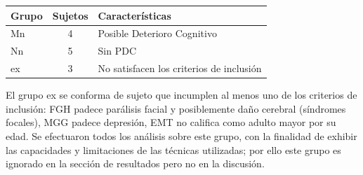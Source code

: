 \begin{table}[h]
\centering
\begin{tabular}{lcl}
\toprule
Grupo & Sujetos & Características \\
\midrule
Mn & 4 & Posible Deterioro Cognitivo \\
Nn & 5 & Sin PDC \\
ex & 3 & No satisfacen los criterios de inclusión \\
\bottomrule
\end{tabular}
\end{table}
%

El grupo ex se conforma de sujeto que incumplen al menos uno de los criterios de inclusión: {FGH} 
padece parálisis facial y posiblemente daño cerebral (síndromes focales), MGG padece depresión, 
EMT no califica como adulto mayor por su edad.
Se efectuaron todos los análisis sobre este grupo, con la finalidad de exhibir las capacidades y
limitaciones de las técnicas utilizadas; por ello este grupo es ignorado en la sección de 
resultados pero no en la discusión.


